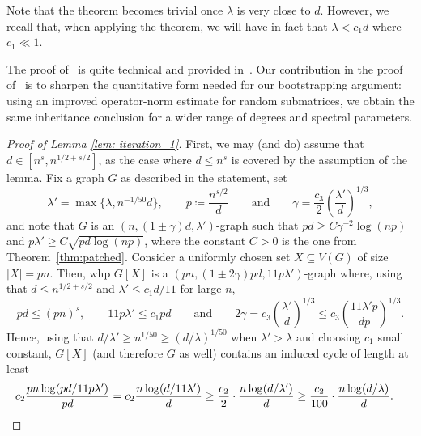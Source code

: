 \documentclass[reqno,a4paper]{amsart}
\theoremstyle{definition}
\begin{document}
Note that the theorem becomes trivial once $\lambda$ is very close to $d$. However, we recall that, when applying the theorem, we will have in fact that $\lambda<c_1d$ where $c_1\ll 1$.

The proof of~ is quite technical and provided in~. Our contribution in the proof of~ is to sharpen the quantitative form needed for our bootstrapping argument: using an improved operator-norm estimate for random submatrices, we obtain the same inheritance conclusion for a wider range of degrees and spectral parameters.


\begin{proof}[Proof of Lemma \ref{lem: iteration_1}]
First, we may (and do) assume that $d\in [n^s,n^{1/2+s/2}]$, as the case where $d\le n^s$ is covered by the assumption of the lemma.
Fix a graph $G$ as described in the statement, set 
\[\lambda' = \max\{\lambda, n^{-1/50}d\},\qquad p\coloneqq \frac{n^{s/2}}{d}\qquad\text{and}\qquad \gamma=\frac{c_3}{2}\left(\frac{\lambda'}{d}\right)^{1/3},\] 
and note that $G$ is an $\left(n,\left(1\pm \gamma\right)d,\lambda'\right)$-graph such that $pd\ge C\gamma^{-2}\log (np)$ and $p\lambda'\ge C\sqrt{pd\log (np)}$, where the constant $C>0$ is the one from Theorem~\ref{thm:patched}.
Consider a uniformly chosen set $X\subseteq V(G)$ of size $|X|=pn$. 
Then, whp $G[X]$ is a $\left(pn, (1\pm 2\gamma)pd, 11p\lambda' \right)$-graph where, using that $d\le n^{1/2+s/2}$ and $\lambda'\le c_1d/11$ for large $n$,
\[pd \le (pn)^{s},\qquad 11p\lambda'\le c_1 pd\qquad \text{and}\qquad 2\gamma=c_3\left(\frac{\lambda'}{d}\right)^{1/3}\le c_3\left(\frac{11\lambda' p}{dp}\right)^{1/3}.\]
Hence, using that $d/\lambda'\ge n^{1/50}\ge (d/\lambda)^{1/50}$ when $\lambda'>\lambda$ and choosing $c_1$ small constant, $G[X]$ (and therefore $G$ as well) contains an induced cycle of length at least
    \begin{align*}
        c_2\frac{pn\log(pd/11p\lambda')}{pd}&=c_2\frac{n\log(d/11\lambda')}{d}\ge \frac{c_2}{2}\cdot \frac{n\log(d/\lambda')}{d}\ge \frac{c_2}{100}\cdot \frac{n\log(d/\lambda)}{d}.\qedhere
    \end{align*}
\end{proof}
\end{document}
